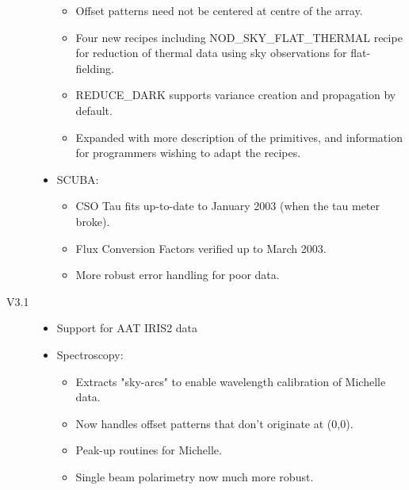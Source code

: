 \documentclass[twoside,11pt,nolof]{starlink}
\begin{document}
\begin{description}
\begin{itemize}
\begin{itemize}
\item Offset patterns need not be centered at centre of the array.

\item Four new recipes including NOD\_SKY\_FLAT\_THERMAL recipe for reduction
    of thermal data using sky observations for flat-fielding.

\item REDUCE\_DARK supports variance creation and propagation by default.

\item Expanded  with more description of the
  primitives, and information for programmers wishing to adapt the recipes.

\end{itemize}

\item SCUBA:

\begin{itemize}

\item CSO Tau fits up-to-date to January 2003 (when the tau meter broke).

\item Flux Conversion Factors verified up to March 2003.

\item More robust error handling for poor data.

\end{itemize}

\end{itemize}

\item[V3.1]

\begin{itemize}

\item Support for AAT IRIS2 data

\item Spectroscopy:

\begin{itemize}

\item Extracts "sky-arcs" to enable wavelength calibration of Michelle data.

\item Now handles offset patterns that don't originate at (0,0).

\item Peak-up routines for Michelle.

\item Single beam polarimetry now much more robust.


\end{itemize}
\end{itemize}
\end{description}
\end{document}
